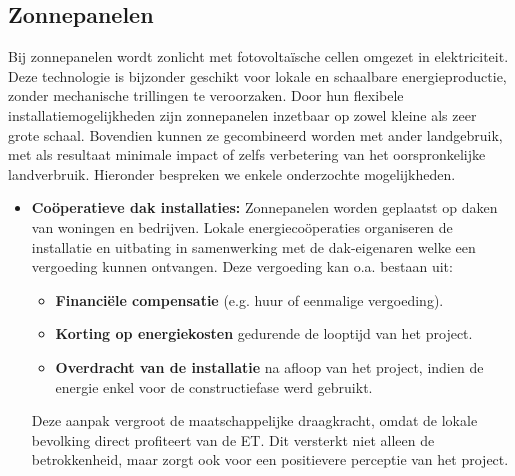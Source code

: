 \subsection{Zonnepanelen}\label{sec:energiebronnen_Zonnepanelen}
Bij zonnepanelen wordt zonlicht met fotovoltaïsche cellen omgezet in elektriciteit. Deze technologie is bijzonder geschikt voor lokale en schaalbare energieproductie, zonder mechanische trillingen te veroorzaken. Door hun flexibele installatiemogelijkheden zijn zonnepanelen inzetbaar op zowel kleine als zeer grote schaal. Bovendien kunnen ze gecombineerd worden met ander landgebruik, met als resultaat minimale impact of zelfs verbetering van het oorspronkelijke landverbruik. Hieronder bespreken we enkele onderzochte mogelijkheden.

\begin{itemize}

    \item \textbf{Coöperatieve dak installaties:} Zonnepanelen worden geplaatst op daken van woningen en bedrijven. Lokale energiecoöperaties organiseren de installatie en uitbating in samenwerking met de dak-eigenaren welke een vergoeding kunnen ontvangen. Deze vergoeding kan o.a. bestaan uit:

    \begin{itemize}
        \item \textbf{Financiële compensatie} (e.g. huur of eenmalige vergoeding).
        \item \textbf{Korting op energiekosten} gedurende de looptijd van het project.
        \item \textbf{Overdracht van de installatie} na afloop van het project, indien de energie enkel voor de constructiefase werd gebruikt.
    \end{itemize}

    Deze aanpak vergroot de maatschappelijke draagkracht, omdat de lokale bevolking direct profiteert van de ET. Dit versterkt niet alleen de betrokkenheid, maar zorgt ook voor een positievere perceptie van het project.


\end{itemize}

